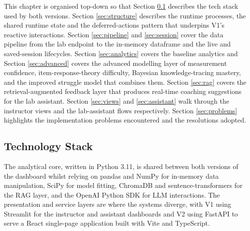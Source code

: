 This chapter is organised top-down so that Section \ref{sec:techstack} describes the tech stack used by both versions. 
Section \ref{sec:structure} describes the runtime processes, the shared runtime state and the deferred-actions pattern that underpins V1's reactive interactions. 
Section \ref{sec:pipeline} and \ref{sec:session} cover the data pipeline from the lab endpoint to the in-memory dataframe and the live and saved-session lifecycles. 
Section \ref{sec:analytics} covers the baseline analytics and Section \ref{sec:advanced} covers the advanced modelling layer of measurement confidence, item-response-theory difficulty, Bayesian knowledge-tracing mastery, and the improved struggle model that combines them. 
Section \ref{sec:rag} covers the retrieval-augmented feedback layer that produces real-time coaching suggestions for the lab assistant.
Section \ref{sec:views} and \ref{sec:assistant} walk through the instructor views and the lab-assistant flows respectively. 
Section \ref{sec:problems} highlights the implementation problems encountered and the resolutions adopted.


\subsection{Technology Stack} \label{sec:techstack}

The analytical core, written in Python 3.11, is shared between both versions of the dashboard whilst relying on pandas and NumPy for in-memory data manipulation, SciPy for model fitting, ChromaDB and sentence-transformers for the RAG layer, and the OpenAI Python SDK for LLM interactions. 
The presentation and service layers are where the systems diverge, with V1 using Streamlit for the instructor and assistant dashboards and V2 using FastAPI to serve a React single-page application built with Vite and TypeScript.

